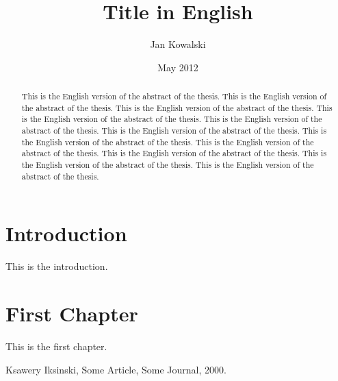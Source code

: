 \documentclass{pracamgren}
\author{Jan Kowalski}
\title{Title in English}
\date{May 2012}
\begin{document}
\maketitle



\begin{abstract}
This is the English version of the abstract of the thesis.
This is the English version of the abstract of the thesis.
This is the English version of the abstract of the thesis.
This is the English version of the abstract of the thesis.
This is the English version of the abstract of the thesis.
This is the English version of the abstract of the thesis.
This is the English version of the abstract of the thesis.
This is the English version of the abstract of the thesis.
This is the English version of the abstract of the thesis.
This is the English version of the abstract of the thesis.
This is the English version of the abstract of the thesis.

\end{abstract}

\tableofcontents

\chapter*{Introduction}

This is the introduction.

\chapter{First Chapter}

This is the first chapter.

\begin{thebibliography}{99}
Ksawery Iksinski, Some Article, Some Journal, 2000.
\end{thebibliography}
\end{document}
